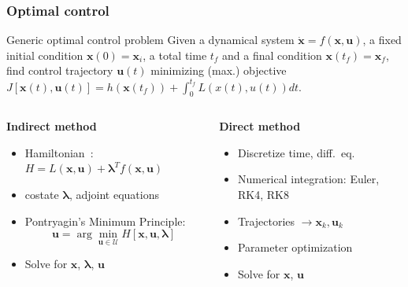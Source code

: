 \documentclass{beamer}
\begin{document}
\begin{frame}
    \frametitle{Optimal control}\pause
    \begin{block}{Generic optimal control problem}
        Given a dynamical system \(\dot{\mathbf{x}} = f(\mathbf{x}, \mathbf{u})\), a fixed initial condition \(\mathbf{x}(0) = \mathbf{x}_i\), a total time \(t_f\) and a final condition \(\mathbf{x}(t_f) = \mathbf{x}_f\), find control trajectory \(\mathbf{u}(t)\) minimizing (max.) objective \(J[\mathbf{x}(t), \mathbf{u}(t)] = h(\mathbf{x}(t_f))+\int_0^{t_f} L(x(t), u(t)) dt\).
    \end{block}\pause
    \begin{columns}
        \begin{column}{0.5\linewidth}
            \begin{center}
                \textbf{Indirect method}
            \end{center}
            \begin{itemize}
                \item Hamiltonian~\cite{bertsekas}: \(H = L(\mathbf{x}, \mathbf{u}) + \mathbf{\lambda}^T f(\mathbf{x}, \mathbf{u})\)
                \item costate \(\mathbf{\lambda}\), adjoint equations
                \item Pontryagin's Minimum Principle:
                \begin{equation}
                    \mathbf{u} = \arg \min_{\mathbf{u} \in \mathcal{U}} H[\mathbf{x}, \mathbf{u}, \mathbf{\lambda}]
                \end{equation}
                \item Solve for \(\mathbf{x}\), \(\mathbf{\lambda}\), \(\mathbf{u}\)
            \end{itemize}
        \end{column}
        \begin{column}{0.5\linewidth}\pause
            \begin{center}
                \textbf{Direct method}
            \end{center}
            \begin{itemize}
                \item Discretize time, diff.\ eq.
                \item Numerical integration: Euler, RK4, RK8
                \item Trajectories \(\rightarrow \mathbf{x}_k, \mathbf{u}_k\)
                \item Parameter optimization
                \item Solve for \(\mathbf{x}\), \(\mathbf{u}\)
            \end{itemize}
        \end{column}
    \end{columns}
\end{frame}
\end{document}
